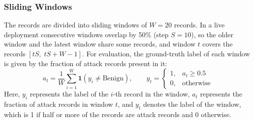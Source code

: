 \documentclass[]{interact}
\theoremstyle{plain}%
\theoremstyle{definition}
\theoremstyle{remark}
\begin{document}
\subsubsection{Sliding Windows}
The records are divided into sliding windows of $W = 20$ records. In a live deployment consecutive windows overlap by 50\% (step $S = 10$), so the older window and the latest window share some records, and window $t$ covers the records $[tS,\; tS + W - 1]$. For evaluation, the ground-truth label of each window is given by the fraction of attack records present in it:
\begin{equation}
  a_t = \frac{1}{W}\sum_{i=1}^{W} \mathbf{1}\!\left(y_i \neq \text{Benign}\right),
  \qquad
  y_t =
  \begin{cases}
    1, & a_t \ge 0.5\\
    0, & \text{otherwise}
  \end{cases}
\end{equation}
Here, $y_i$ represents the label of the $i$-th record in the window, $a_t$ represents the fraction of attack records in window $t$, and $y_t$ denotes the label of the window, which is 1 if half or more of the records are attack records and 0 otherwise.
\end{document}
